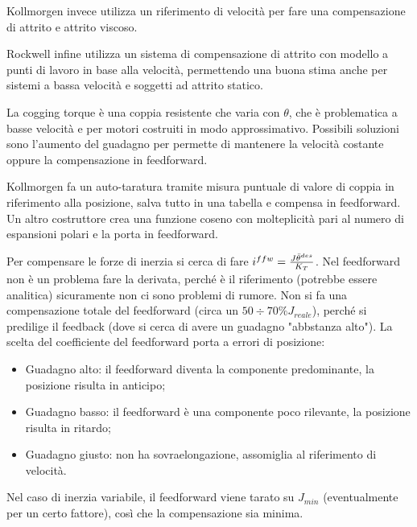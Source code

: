 Kollmorgen invece utilizza un riferimento di velocità per fare una compensazione di attrito e attrito viscoso.

Rockwell infine utilizza un sistema di compensazione di attrito con modello a punti di lavoro in base alla velocità, permettendo una buona stima anche per sistemi a bassa velocità e soggetti ad attrito statico.

La cogging torque è una coppia resistente che varia con \(\theta\), che è problematica a basse velocità e per motori costruiti in modo approssimativo. Possibili soluzioni sono l'aumento del guadagno per permette di mantenere la velocità costante oppure la compensazione in feedforward.

Kollmorgen fa un auto-taratura tramite misura puntuale di valore di coppia in riferimento alla posizione, salva tutto in una tabella e compensa in feedforward.
Un altro costruttore crea una funzione coseno con molteplicità pari al numero di espansioni polari e la porta in feedforward.

Per compensare le forze di inerzia si cerca di fare \(i^{ffw}=\frac{J\Ddot{\theta}^{des}}{K_T}\). Nel feedforward non è un problema fare la derivata, perché è il riferimento (potrebbe essere analitica) sicuramente non ci sono problemi di rumore.
Non si fa una compensazione totale del feedforward (circa un \(50\div 70\% J_{reale}\)), perché si predilige il feedback (dove si cerca di avere un guadagno "abbstanza alto").
La scelta del coefficiente del feedforward porta a errori di posizione:
\begin{itemize}
    \item Guadagno alto: il feedforward diventa la componente predominante, la posizione risulta in anticipo;
    \item Guadagno basso: il feedforward è una componente poco rilevante, la posizione risulta in ritardo;
    \item Guadagno giusto: non ha sovraelongazione, assomiglia al riferimento di velocità.
\end{itemize}


Nel caso di inerzia variabile, il feedforward viene tarato su \(J_{min}\) (eventualmente per un certo fattore), così che la compensazione sia minima.



